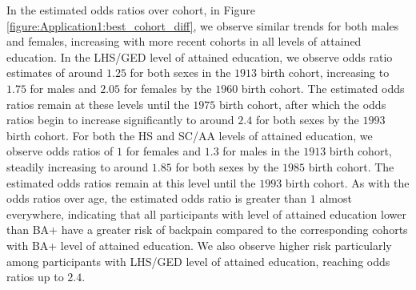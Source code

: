 \vspace{-0.2cm}
In the estimated odds ratios over cohort, in Figure \ref{figure:Application1:best_cohort_diff}, we observe similar trends for both males and females, increasing with more recent cohorts in all levels of attained education. In the LHS/GED level of attained education, we observe odds ratio estimates of around $1.25$ for both sexes in the $1913$ birth cohort, increasing to $1.75$ for males and $2.05$ for females by the $1960$ birth cohort. The estimated odds ratios remain at these levels until the $1975$ birth cohort, after which the odds ratios begin to increase significantly to around $2.4$ for both sexes by the $1993$ birth cohort. For both the HS and SC/AA levels of attained education, we observe odds ratios of $1$ for females and $1.3$ for males in the $1913$ birth cohort, steadily increasing to around $1.85$ for both sexes by the $1985$ birth cohort. The estimated odds ratios remain at this level until the $1993$ birth cohort. As with the odds ratios over age, the estimated odds ratio is greater than $1$ almost everywhere, indicating that all participants with level of attained education lower than BA+ have a greater risk of backpain compared to the corresponding cohorts with BA+ level of attained education. We also observe higher risk particularly among participants with LHS/GED level of attained education, reaching odds ratios up to $2.4$.

